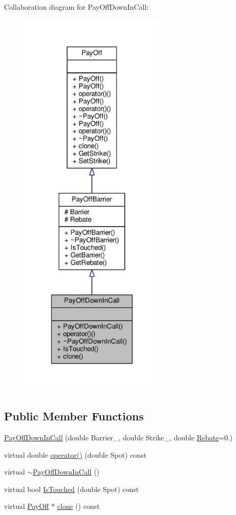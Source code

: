 Collaboration diagram for Pay\+Off\+Down\+In\+Call\+:
\nopagebreak
\begin{figure}[H]
\begin{center}
\leavevmode
\includegraphics[width=199pt]{classPayOffDownInCall__coll__graph}
\end{center}
\end{figure}
\subsection*{Public Member Functions}
\begin{DoxyCompactItemize}
\item 
\hyperlink{classPayOffDownInCall_ab3815b315c2216e362e3e0db8e71c50c}{Pay\+Off\+Down\+In\+Call} (double Barrier\+\_\+, double Strike\+\_\+, double \hyperlink{classPayOffBarrier_aca3ea631dcdb28a1df971b74774e41f8}{Rebate}=0.)
\item 
virtual double \hyperlink{classPayOffDownInCall_a606871776edae20190b3b0b4ce822dcc}{operator()} (double Spot) const
\item 
virtual \hyperlink{classPayOffDownInCall_af5c5e261b40e91c3e3a94d346bd9ed97}{$\sim$\+Pay\+Off\+Down\+In\+Call} ()
\item 
virtual bool \hyperlink{classPayOffDownInCall_a2be6d6571ea7969db355d39980326def}{Is\+Touched} (double Spot) const
\item 
virtual \hyperlink{classPayOff}{Pay\+Off} $\ast$ \hyperlink{classPayOffDownInCall_a2e8bda4a06ef878d1344a8752e04b7df}{clone} () const
\end{DoxyCompactItemize}

